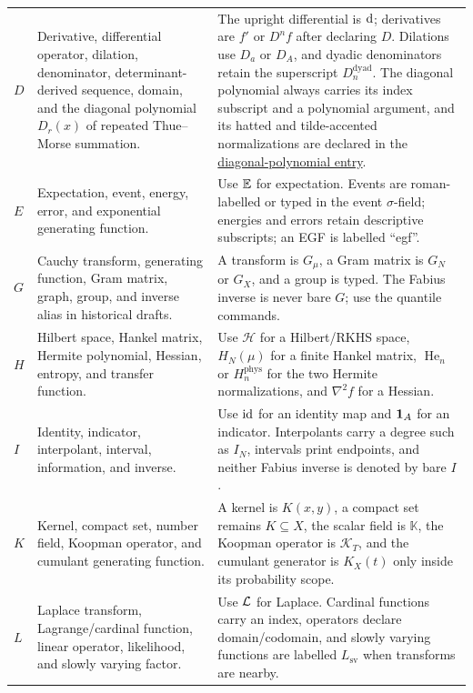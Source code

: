 \documentclass[11pt,oneside]{article}
\theoremstyle{definition}
\theoremstyle{remark}
\begin{document}
\begin{longtable}{@{}p{}p{}p{}@{}}
$D$ & Derivative, differential operator, dilation, denominator, determinant-derived
sequence, domain, and the diagonal polynomial $D_r(x)$ of repeated Thue--Morse
summation. & The upright differential is $\mathop{}\!\mathrm{d}$; derivatives are
$f'$ or $D^nf$ after declaring $D$.  Dilations use $D_a$ or $D_A$, and dyadic
denominators retain the superscript $D_n^{\mathrm{dyad}}$.  The diagonal polynomial
always carries its index subscript and a polynomial argument, and its hatted and
tilde-accented normalizations are declared in the
\hyperlink{notation:thue-morse-diagonal-polynomial}{diagonal-polynomial entry}.\\
$E$ & Expectation, event, energy, error, and exponential generating function. & Use
$\mathbb{E}$ for expectation.  Events are roman-labelled or typed in the event
$\sigma$-field; energies and errors retain descriptive subscripts; an EGF is labelled
``egf''.\\
$G$ & Cauchy transform, generating function, Gram matrix, graph, group, and inverse
alias in historical drafts. & A transform is $G_\mu$, a Gram matrix is $G_N$ or
$G_X$, and a group is typed.  The Fabius inverse is never bare $G$; use the quantile
commands.\\
$H$ & Hilbert space, Hankel matrix, Hermite polynomial, Hessian, entropy, and transfer
function. & Use $\mathcal H$ for a Hilbert/RKHS space, $H_N(\mu)$ for a finite Hankel
matrix, $\operatorname{He}_n$ or $H_n^{\mathrm{phys}}$ for the two Hermite
normalizations, and $\nabla^2f$ for a Hessian.\\
$I$ & Identity, indicator, interpolant, interval, information, and inverse. & Use
$\operatorname{id}$ for an identity map and $\mathbf{1}_{A}$ for an indicator.
Interpolants carry a degree such as $I_N$, intervals print endpoints, and neither Fabius
inverse is denoted by bare $I$.\\
$K$ & Kernel, compact set, number field, Koopman operator, and cumulant generating
function. & A kernel is $K(x,y)$, a compact set remains $K\subseteq X$, the scalar field
is $\mathbb K$, the Koopman operator is $\mathcal K_T$, and the cumulant generator is
$K_X(t)$ only inside its probability scope.\\
$L$ & Laplace transform, Lagrange/cardinal function, linear operator, likelihood, and
slowly varying factor. & Use $\mathcal{L}$ for Laplace.  Cardinal functions
carry an index, operators declare domain/codomain, and slowly varying functions are
labelled $L_{\mathrm{sv}}$ when transforms are nearby.\\

\end{longtable}
\end{document}
